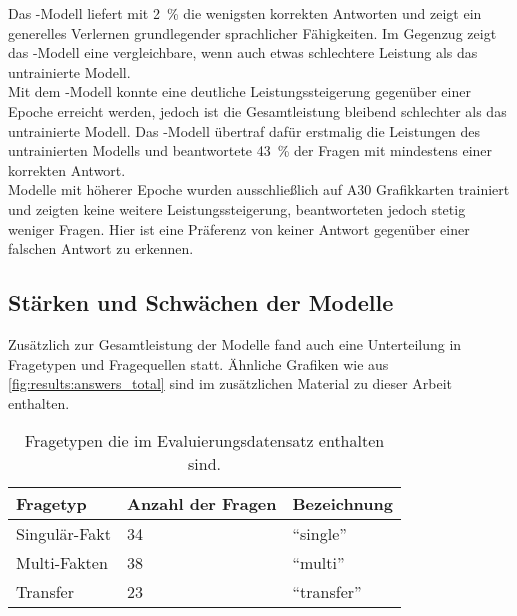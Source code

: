Das \liv-Modell liefert mit \SI{2}{\percent} die wenigsten korrekten Antworten und zeigt ein generelles Verlernen grundlegender sprachlicher Fähigkeiten.
Im Gegenzug zeigt das \lia-Modell eine vergleichbare, wenn auch etwas schlechtere Leistung als das untrainierte Modell.\\

Mit dem \lev-Modell konnte eine deutliche Leistungssteigerung gegenüber einer Epoche erreicht werden, jedoch ist die Gesamtleistung bleibend schlechter als das untrainierte Modell.
Das \lea-Modell übertraf dafür erstmalig die Leistungen des untrainierten Modells und beantwortete \SI{43}{\percent} der Fragen mit mindestens einer korrekten Antwort.\\

Modelle mit höherer Epoche wurden ausschließlich auf A30 Grafikkarten trainiert und zeigten keine weitere Leistungssteigerung, beantworteten jedoch stetig weniger Fragen.
Hier ist eine Präferenz von keiner Antwort gegenüber einer falschen Antwort zu erkennen.\\

\subsection{Stärken und Schwächen der Modelle}\label{subsec:results:correctness:strengths}
Zusätzlich zur Gesamtleistung der Modelle fand auch eine Unterteilung in Fragetypen und Fragequellen statt.
Ähnliche Grafiken wie aus \cref{fig:results:answers_total} sind im zusätzlichen Material zu dieser Arbeit enthalten.
\begin{table}
    \centering
    \begin{tabular}{lll}
        \toprule
        \textbf{Fragetyp} & \textbf{Anzahl der Fragen} & \textbf{Bezeichnung} \\
        \midrule
        Singulär-Fakt     & 34                         & \enquote{single}     \\
        Multi-Fakten      & 38                         & \enquote{multi}      \\
        Transfer          & 23                         & \enquote{transfer}   \\
        \bottomrule
    \end{tabular}
    \caption{Fragetypen die im Evaluierungsdatensatz enthalten sind.}\label{tab:eval-question-types}
\end{table}



